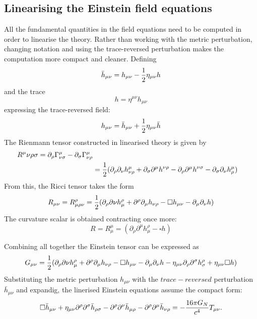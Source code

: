 \documentclass[binding=0.6cm, LaM]{sapthesis}
\begin{document}
\subsection{Linearising the Einstein field equations}
All the fundamental quantities in the field equations need to be computed in order to linearise the theory. 
Rather than working with the metric perturbation, changing notation and using the trace-reversed perturbation makes the computation more compact and cleaner. Defining 
\begin{equation}
{\bar h}_{\mu\nu} = h_{\mu\nu} - {1 \over {2}}\eta_{\mu\nu}h  
\end{equation}
and the trace 
\begin{equation}
h = \eta^{\mu\nu}h_{\mu\nu}
\end{equation}
expressing the trace-reversed field:
\begin{equation}
h_{\mu\nu} = {\bar h}_{\mu\nu} + {1 \over {2}}\eta_{\mu\nu}{\bar h}
\end{equation} 
The Rienmann tensor constructed in linearised theory is given by
\begin{align}
R^{\mu}{\nu\rho\sigma} = \partial_{\rho} \Gamma^{\mu}_{\nu\sigma} - \partial_{\sigma}\Gamma^{\mu}_{\nu\rho}  \\
&={ 1 \over 2} (\partial_{\rho}\partial_{\nu}h^{\mu}_{\nu\rho} + \partial_{\sigma}\partial^{\mu}h^{\nu\rho} - \partial_{\rho}\partial^{\mu}h^{\nu\sigma} - \partial_{\sigma}\partial_{\nu}h^{\mu}_{\rho})
\end{align}
From this, the Ricci tensor takes the form
\begin{equation}
R_{\mu\nu} = R^{\rho}_{\mu\rho\nu} = {1 \over 2}(\partial_{\rho}\partial{\nu}h^{\rho}_{\mu} + \partial^{\rho}\partial_{\mu}h_{\nu\rho} - \square h_{\mu\nu} - \partial_{\mu}\partial_{\nu}h)
\end{equation}
The curvature scalar is obtained contracting once more:
\begin{equation}
R = R^{\mu}_{\mu} = (\partial_{\rho}\partial^{\mu}h^{\rho}_{\mu} - \square h)
\end{equation}

Combining all together the Einstein tensor can be expressed as
\begin{equation}
G_{\mu\nu} = {1 \over 2}(\partial_{\rho}\partial{\nu}h^{\rho}_{\mu} + \partial^{\rho}\partial_{\mu}h_{\nu\rho} - \square h_{\mu\nu} - \partial_{\mu}\partial_{\nu}h - \eta_{\mu\nu}\partial_{\rho}\partial^{\sigma}h^{\rho}_{\sigma} + \eta_{\mu\nu}\square h)
\end{equation}
Substituting the metric perturbation $h_{\mu\nu}$  with the $trace-reversed$ perturbation ${\bar h}_{\mu\nu}$ and expandig, the linerised Einstein equations assume the  compact form:
\begin{equation}
\square {\bar h}_{\mu\nu} + \eta_{\mu\nu}{\partial}^{\rho}{\partial}^{\sigma}{\bar h}_{\rho\sigma} - {\partial}^{\rho}{\partial}^{\nu}{\bar h}_{\mu\rho} - {\partial}^{\rho}{\partial}^{\mu}{\bar h}_{\nu\rho} = - {{16\pi G_{N}} \over {c^4}}T_{\mu\nu}.
\end{equation}
\end{document}
